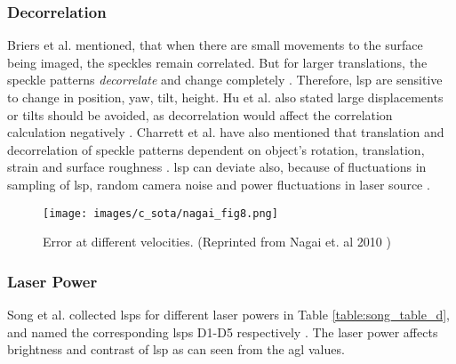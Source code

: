     \subsubsection{Decorrelation}\label{subsubsection:decorrelation}
    Briers et al. mentioned, that when there are small movements to the surface being imaged, the speckles remain correlated. But for larger translations, the speckle patterns \emph{decorrelate} and change completely \cite{briers}. Therefore, \gls{lsp} are sensitive to change in position, yaw, tilt, height. Hu et al. also stated large displacements or tilts should be avoided, as decorrelation would affect the correlation calculation negatively \cite{hu}. Charrett et al. have also mentioned that translation and decorrelation of speckle patterns dependent on object's rotation, translation, strain and surface roughness \cite{charrett_2018}. \Gls{lsp} can deviate also, because of fluctuations in sampling of \Gls{lsp}, random camera noise and power fluctuations in laser source \cite{charrett_2019}.


    \begin{figure}[ht]
        \centering
        \texttt{[image: images/c\_sota/nagai\_fig8.png]}
        \caption{Error at different velocities. (Reprinted from Nagai et. al 2010 \cite{nagai})}
        \label{fig:nagai_fig8}
    \end{figure}
    

    \subsubsection{Laser Power}
    Song et al. collected \glspl{lsp} for different laser powers in Table \ref{table:song_table_d}, and named the corresponding \glspl{lsp} D1-D5 respectively \cite{song}. The laser power affects brightness and contrast of \gls{lsp} as can seen from the \gls{agl} values.

